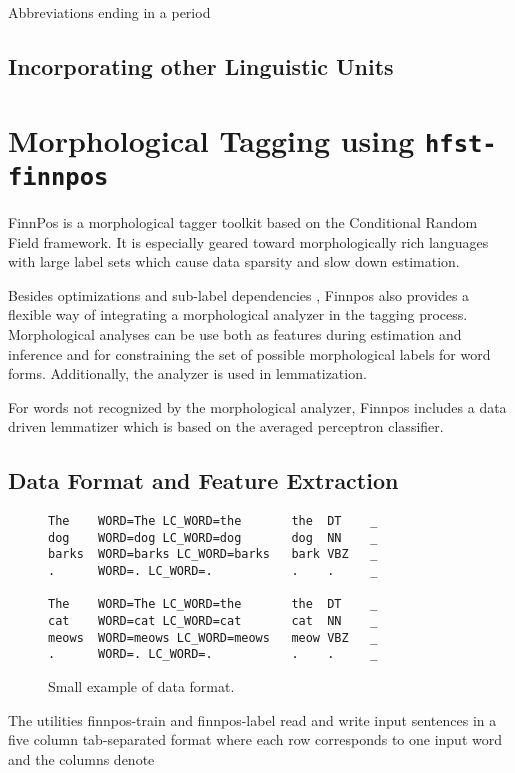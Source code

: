 \documentclass{llncs}
\begin{document}
Abbreviations ending in a period

\subsection{Incorporating other Linguistic Units}

\section{Morphological Tagging using {\tt hfst-finnpos}}\label{sec:morph-tagging}

FinnPos \cite{silfverberg2015} is a morphological tagger toolkit based
on the Conditional Random Field framework. It is especially geared
toward morphologically rich languages with large label sets which
cause data sparsity and slow down estimation.



Besides optimizations and sub-label dependencies
\cite{silfverberg2014}, Finnpos also provides a flexible way of
integrating a morphological analyzer in the tagging
process. Morphological analyses can be use both as features during
estimation and inference and for constraining the set of possible
morphological labels for word forms. Additionally, the analyzer is
used in lemmatization.

For words not recognized by the morphological analyzer, Finnpos
includes a data driven lemmatizer which is based on the averaged
perceptron classifier.

\subsection{Data Format and Feature Extraction}

\begin{figure}
\begin{verbatim}
The    WORD=The LC_WORD=the       the  DT    _
dog    WORD=dog LC_WORD=dog       dog  NN    _
barks  WORD=barks LC_WORD=barks   bark VBZ   _
.      WORD=. LC_WORD=.           .    .     _

The    WORD=The LC_WORD=the       the  DT    _
cat    WORD=cat LC_WORD=cat       cat  NN    _
meows  WORD=meows LC_WORD=meows   meow VBZ   _
.      WORD=. LC_WORD=.           .    .     _
\end{verbatim}
\caption{Small example of data format.}
\end{figure}

The utilities finnpos-train and finnpos-label read and write input sentences in a five column tab-separated format where each row corresponds to one input word and the columns denote
\end{document}
